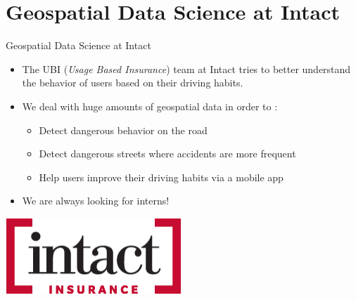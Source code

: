 \documentclass[aspectratio=169]{beamer}
\begin{document}





\section{Geospatial Data Science at Intact}

\begin{frame}{Geospatial Data Science at Intact}
\begin{itemize}
	\item The UBI (\textit{Usage Based Insurance}) team at Intact tries to better understand the behavior of users based on their driving habits.
	\vspace{.5cm}
	\item We deal with huge amounts of geospatial data in order to :
	\begin{itemize}
		\item Detect dangerous behavior on the road
		\item Detect dangerous streets where accidents are more frequent
		\item Help users improve their driving habits via a mobile app
	\end{itemize}
	\vspace{.5cm}
	\item We are always looking for interns!
\end{itemize}

\centering
\href{https://careers.intact.ca/ca/en/}{\includegraphics[width=.2\textwidth]{figures/intact_logo}}
\end{frame}
\end{document}
